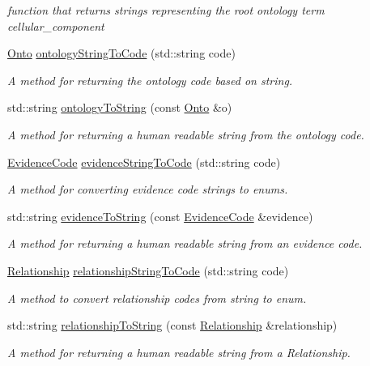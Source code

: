 \begin{DoxyCompactItemize}
\begin{DoxyCompactList}\small\item\em function that returns strings representing the root ontology term cellular\+\_\+component \end{DoxyCompactList}\item 
\hyperlink{namespaceGO_a5ae335887b5cf40a9ef3045be9247fc3}{Onto} \hyperlink{namespaceGO_a27850aa3de798d067cc60a03a8552fae}{ontology\+String\+To\+Code} (std\+::string code)
\begin{DoxyCompactList}\small\item\em A method for returning the ontology code based on string. \end{DoxyCompactList}\item 
std\+::string \hyperlink{namespaceGO_adf5775fc9cf071de5a920e7634a12f40}{ontology\+To\+String} (const \hyperlink{namespaceGO_a5ae335887b5cf40a9ef3045be9247fc3}{Onto} \&o)
\begin{DoxyCompactList}\small\item\em A method for returning a human readable string from the ontology code. \end{DoxyCompactList}\item 
\hyperlink{namespaceGO_a4ce5387bbcdaec3648957c7903f2caf3}{Evidence\+Code} \hyperlink{namespaceGO_a4403262f174622b96e89612c02e46532}{evidence\+String\+To\+Code} (std\+::string code)
\begin{DoxyCompactList}\small\item\em A method for converting evidence code strings to enums. \end{DoxyCompactList}\item 
std\+::string \hyperlink{namespaceGO_a11b7264a995616db04a0170821310ef8}{evidence\+To\+String} (const \hyperlink{namespaceGO_a4ce5387bbcdaec3648957c7903f2caf3}{Evidence\+Code} \&evidence)
\begin{DoxyCompactList}\small\item\em A method for returning a human readable string from an evidence code. \end{DoxyCompactList}\item 
\hyperlink{namespaceGO_aaa3905b2e000a8be411da8038827f993}{Relationship} \hyperlink{namespaceGO_a6418070e75662d9f3531324cc0c99334}{relationship\+String\+To\+Code} (std\+::string code)
\begin{DoxyCompactList}\small\item\em A method to convert relationship codes from string to enum. \end{DoxyCompactList}\item 
std\+::string \hyperlink{namespaceGO_a4621c38a5e5ed683f83bd0a9ca6e51ee}{relationship\+To\+String} (const \hyperlink{namespaceGO_aaa3905b2e000a8be411da8038827f993}{Relationship} \&relationship)
\begin{DoxyCompactList}\small\item\em A method for returning a human readable string from a Relationship. \end{DoxyCompactList}\end{DoxyCompactItemize}


